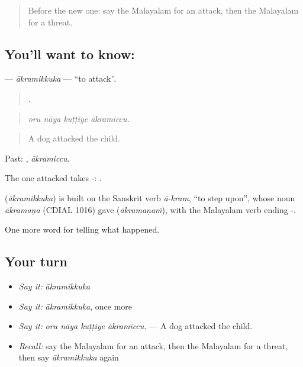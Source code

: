 \label{lesson:ML-C373-akramikkuka}



\begin{quote}
Before the new one: say the Malayalam for an attack, then the Malayalam for a threat.
\end{quote}

\subsection*{You'll want to know: }
\textbf{} — \emph{ākramikkuka} — \textquotedblleft{}to attack\textquotedblright{}.

\begin{quote}
   .
\end{quote}

\begin{quote}
\emph{oru nāya kuṭṭiye ākramiccu.}
\end{quote}

\begin{quote}
A dog attacked the child.
\end{quote}

Past: , \emph{ākramiccu}.

The one attacked takes -:  .

\begin{cousinweb}
\textbf{} (\emph{ākramikkuka}) is built on the Sanskrit verb \emph{ā-kram}, \textquotedblleft{}to step upon\textquotedblright{}, whose noun \emph{ākramaṇa} (CDIAL 1016) gave  (\emph{ākramaṇaṁ}), with the Malayalam verb ending -.
\end{cousinweb}

\begin{grammarlens}[title={What you've built}]
One more word for telling what happened.
\end{grammarlens}

\subsection*{Your turn}
\begin{itemize}
\raggedright
  \item \emph{Say it:} \emph{ākramikkuka}
  \item \emph{Say it:} \emph{ākramikkuka}, once more
  \item \emph{Say it:} \emph{oru nāya kuṭṭiye ākramiccu.} — A dog attacked the child.
  \item \emph{Recall:} say the Malayalam for an attack, then the Malayalam for a threat, then say \emph{ākramikkuka} again
\end{itemize}

